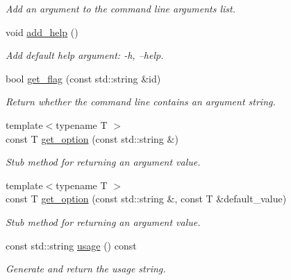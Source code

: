 \begin{DoxyCompactItemize}
\begin{DoxyCompactList}\small\item\em Add an argument to the command line arguments list. \end{DoxyCompactList}\item 
\mbox{\label{classcppargparse_1_1parser_1_1ArgumentParserBase_aac102de015dd9066135c08adedb02300}} 
void \hyperlink{classcppargparse_1_1parser_1_1ArgumentParserBase_aac102de015dd9066135c08adedb02300}{add\+\_\+help} ()
\begin{DoxyCompactList}\small\item\em Add default help argument\+: -\/h, --help. \end{DoxyCompactList}\item 
bool \hyperlink{classcppargparse_1_1parser_1_1ArgumentParserBase_acc395ccc36f04e93f0cb9732bd040802}{get\+\_\+flag} (const std\+::string \&id)
\begin{DoxyCompactList}\small\item\em Return whether the command line contains an argument string. \end{DoxyCompactList}\item 
{\footnotesize template$<$typename T $>$ }\\const T \hyperlink{classcppargparse_1_1parser_1_1ArgumentParserBase_a9b716b70f52707633faccdc3de63641c}{get\+\_\+option} (const std\+::string \&)
\begin{DoxyCompactList}\small\item\em Stub method for returning an argument value. \end{DoxyCompactList}\item 
{\footnotesize template$<$typename T $>$ }\\const T \hyperlink{classcppargparse_1_1parser_1_1ArgumentParserBase_ad482db4f4cfafdd0a754d32dd3e36e51}{get\+\_\+option} (const std\+::string \&, const T \&default\+\_\+value)
\begin{DoxyCompactList}\small\item\em Stub method for returning an argument value. \end{DoxyCompactList}\item 
const std\+::string \hyperlink{classcppargparse_1_1parser_1_1ArgumentParserBase_af99c2847a2cd19b1444dcb9ab2fb8103}{usage} () const
\begin{DoxyCompactList}\small\item\em Generate and return the usage string. \end{DoxyCompactList}\end{DoxyCompactItemize}
